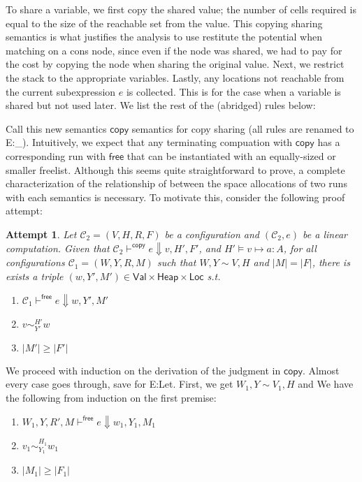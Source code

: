 \documentclass{easychair}
\newcommand{\ms}[1]{\ensuremath{\mathsf{#1}}}
\newcounter{rule}
\newcommand{\veq}[4]{#3 \sim^{#1}_{#2} #4}
\newtheorem{attempt}[theorem]{Attempt}
\theoremstyle{definition}
\begin{document}
To share a variable, we first copy the shared value; the number of cells required is equal to the
size of the reachable set from the value. This copying sharing semantics is what justifies the 
analysis to use restitute the potential when matching on a cons node, 
since even if the node was shared, we had to pay for the cost by copying the node when sharing the 
original value. Next, we restrict the stack to the appropriate variables. 
Lastly, any locations not reachable from the current subexpression $e$ is collected. This is 
for the case when a variable is shared but not used later.  We list the rest of the (abridged) 
rules below:

Call this new semantics $\mathsf{copy}$ semantics for copy sharing
(all rules are renamed to E:\_). 
Intuitively, we expect that any terminating compuation
with $\mathsf{copy}$ has a corresponding run with $\mathsf{free}$ that can be instantiated with 
an equally-sized or smaller freelist. Although this seems quite straightforward to prove, a complete
characterization of the relationship of between the space allocations of two runs with each 
semantics is necessary. To motivate this, consider the following proof attempt: 

\begin{attempt}
	Let $\mathcal{C_2} = (V,H,R,F)$ be a configuration and $(\mathcal{C_2}, e)$ 
	be a linear computation. Given that 
	$\mathcal{C}_2 \vdash^{\mathsf{copy}} e \Downarrow v,H',F'$, and $H' \vDash v \mapsto a : A$, 
	for all configurations $\mathcal{C}_1 = (W,Y,R,M)$ such that $W,Y \sim V,H$ and $|M| = |F|$,
there is exists a triple
$(w,Y',M') \in \ms{Val} \times \ms{Heap} \times \ms{Loc}$ s.t.
	\begin{enumerate}
			\item $\mathcal{C}_1 \vdash^{\mathsf{free}} e \Downarrow w,Y',M'$
			\item $\veq{H'}{Y'}{v}{w}$
			\item $|M'| \ge |F'|$
	\end{enumerate}
\end{attempt}

We proceed with induction on the derivation of the judgment in $\ms{copy}$. 
Almost every case goes through, save for E:Let. 
First, we get $W_1,Y \sim V_1,H$ and We have the following from induction on the first premise:

\begin{enumerate}
	\item $W_1,Y,R',M \vdash^{\mathsf{free}} e \Downarrow w_1,Y_1,M_1$
	\item $\veq{H_1}{Y_1}{v_1}{w_1}$
	\item $|M_1| \ge |F_1|$
\end{enumerate}
\end{document}
